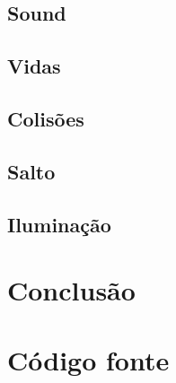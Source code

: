 \documentclass[12pt,a4paper,portuges]{style/myreport}
\begin{document}
\section{Sound}


\section{Vidas}


\section{Colisões}

\section{Salto}

\section{Iluminação}

\newpage

\chapter{Conclusão}




\appendix
\chapter{Código fonte}
\end{document}
